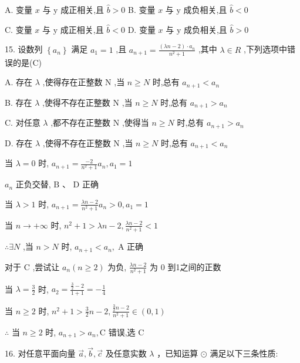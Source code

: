 \documentclass[10pt]{article}
\begin{document}
A. 变量 \(x\) 与 \(\mathrm{y}\) 成正相关,且 \(\widehat{b} > 0\) B. 变量 \(x\) 与 \(\mathrm{y}\) 成负相关,且 \(\widehat{b} < 0\)

C. 变量 \(x\) 与 \(\mathrm{y}\) 成正相关,且 \(\widehat{b} < 0\) D. 变量 \(x\) 与 \(\mathrm{y}\) 成负相关,且 \(\widehat{b} > 0\)

15. 设数列 \(\left\{  {a}_{n}\right\}\) 满足 \({a}_{1} = 1\) ,且 \({a}_{n + 1} = \frac{\left( {{\lambda n} - 2}\right)  \cdot  {a}_{n}}{{n}^{2} + 1}\) ,其中 \(\lambda  \in  R\) ,下列选项中错误的是(C)

A. 存在 \(\lambda\) ,使得存在正整数 \(\mathrm{N}\) ,当 \(n \geq  N\) 时,总有 \({a}_{n + 1} < {a}_{n}\)

B. 存在 \(\lambda\) ,使得不存在正整数 \(\mathrm{N}\) ,当 \(n \geq  N\) 时,总有 \({a}_{n + 1} > {a}_{n}\)

C. 对任意 \(\lambda\) ,都不存在正整数 \(\mathrm{N}\) ,使得当 \(n \geq  N\) 时,总有 \({a}_{n + 1} > {a}_{n}\)

D. 存在 \(\lambda\) ,使得不存在正整数 \(\mathrm{N}\) ,当 \(n \geq  N\) 时,总有 \({a}_{n + 1} < {a}_{n}\)

当 \(\lambda  = 0\) 时, \({a}_{n + 1} = \frac{-2}{{n}^{2} + 1}{a}_{n},{a}_{1} = 1\)

\({a}_{n}\) 正负交替, \(\mathrm{B}\text{ 、 }\mathrm{D}\) 正确

当 \(\lambda  > 1\) 时, \({a}_{n + 1} = \frac{{\lambda n} - 2}{{n}^{2} + 1}{a}_{n} > 0,{a}_{1} = 1\)

当 \(n \rightarrow   + \infty\) 时, \({n}^{2} + 1 > {\lambda n} - 2,\frac{{\lambda n} - 2}{{n}^{2} + 1} < 1\)

\(\therefore \exists N\) ,当 \(n > N\) 时, \({a}_{n + 1} < {a}_{n},\mathrm{\;A}\) 正确

对于 \(\mathrm{C}\) ,尝试让 \({a}_{n}\left( {n \geq  2}\right)\) 为负, \(\frac{{\lambda n} - 2}{{n}^{2} + 1}\) 为 0 到1之间的正数

当 \(\lambda  = \frac{3}{2}\) 时, \({a}_{2} = \frac{\frac{3}{2} - 2}{1 + 1} =  - \frac{1}{4}\)

当 \(n \geq  2\) 时, \({n}^{2} + 1 > \frac{3}{2}n - 2,\frac{\frac{3}{2}n - 2}{{n}^{2} + 1} \in  \left( {0,1}\right)\)

\(\therefore\) 当 \(n \geq  2\) 时, \({a}_{n + 1} > {a}_{n},\mathrm{C}\) 错误,选 \(\mathrm{C}\)

16. 对任意平面向量 \(\overrightarrow{a},\overrightarrow{b},\overrightarrow{c}\) 及任意实数 \(\lambda\) ，已知运算 \(\odot\) 满足以下三条性质:
\end{document}
